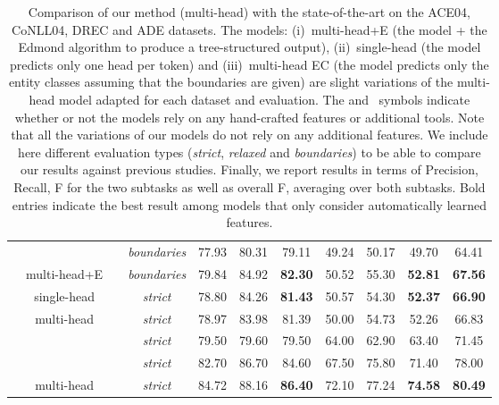 \documentclass[review]{elsarticle}
\newcommand{\cmark}{\ding{51}}\newcommand{\xmark}{\ding{55}}
\begin{document}
\begin{table}
{\begin{tabular}{@{\extracolsep{4pt}}ccccccccccc@{}}
 \midrule
\parbox[c]{5mm}{}
&\cite{bekoulis:18} &\xmark&   \emph{boundaries}&77.93    &80.31  &79.11 &49.24 &50.17 &49.70 &64.41 \\
&  multi-head+E &\xmark& \emph{boundaries}  & 79.84 &  84.92     &\textbf{82.30}     &50.52&55.30&\textbf{52.81}& \textbf{67.56}\\
&single-head &\xmark&  \emph{strict}   &78.80  & 84.26      &\textbf{81.43}     &50.57&54.30&\textbf{52.37} & \textbf{66.90} \\
&multi-head &\xmark&  \emph{strict}  & 78.97&  83.98       &81.39     &50.00&54.73&52.26& 66.83  \\



\midrule
\parbox[c]{5mm}{}

&\cite{li:16}&\cmark &   \emph{strict}    & 79.50 & 79.60       &79.50     &  64.00 & 62.90 & 63.40 & 71.45\\
&\cite{li:17}&\cmark &   \emph{strict}   &82.70  &86.70       &84.60     &67.50 & 75.80 & 71.40 & 78.00 \\

&  multi-head&\xmark & \emph{strict}  & 84.72 & 88.16  &\textbf{86.40}    &72.10 &77.24&\textbf{74.58} & \textbf{80.49} \\







     
\bottomrule
\end{tabular}
 }
\caption{Comparison of our method (multi-head) with the state-of-the-art on the ACE04, CoNLL04, DREC and ADE datasets.
The models:
 (i)~multi-head+E (the model + the Edmond algorithm to produce a tree-structured output),
(ii)~single-head (the model predicts only one head per token) and
(iii)~multi-head EC (the model predicts only the entity classes assuming that the boundaries are given) are slight variations of the multi-head model adapted for each dataset and evaluation. The \cmark and \xmark~symbols indicate whether or not the models rely on any hand-crafted features or additional tools. Note that all the variations of our models do not rely on any additional features. We include here different evaluation types (\emph{strict}, \emph{relaxed} and \emph{boundaries}) to be able to compare our results against previous studies. Finally, we report results in terms of Precision, Recall, F for the two subtasks as well as overall F, averaging over both subtasks.
Bold entries indicate the best result among models that only consider automatically learned features.}
\label{tab:results}
 \end{table}
 
\end{document}

